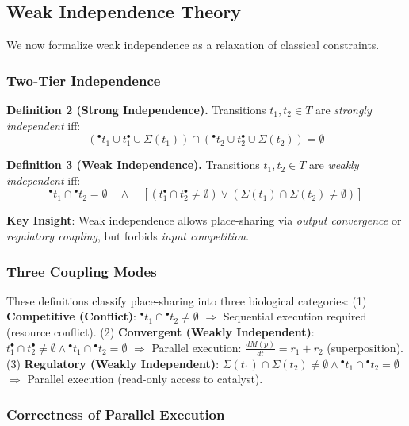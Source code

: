 \documentclass[twocolumn,11pt]{article}
\newcommand{\preset}[1]{\ensuremath{{}^{\bullet}#1}}
\newcommand{\postset}[1]{\ensuremath{#1^{\bullet}}}
\newcommand{\RegSet}[1]{\ensuremath{\Sigma(#1)}}
\begin{document}
\subsection{Weak Independence Theory}

We now formalize weak independence as a relaxation of classical constraints.

\subsubsection{Two-Tier Independence}

{\small
\textbf{Definition 2 (Strong Independence).}
Transitions $t_1, t_2 \in T$ are \emph{strongly independent} iff:
\begin{equation}
(\preset{t_1} \cup \postset{t_1} \cup \RegSet{t_1}) \cap (\preset{t_2} \cup \postset{t_2} \cup \RegSet{t_2}) = \emptyset
\end{equation}
}

{\small
\textbf{Definition 3 (Weak Independence).}
Transitions $t_1, t_2 \in T$ are \emph{weakly independent} iff:
\begin{equation}
\preset{t_1} \cap \preset{t_2} = \emptyset \quad \land \quad [(\postset{t_1} \cap \postset{t_2} \neq \emptyset) \lor (\RegSet{t_1} \cap \RegSet{t_2} \neq \emptyset)]
\end{equation}
}

\textbf{Key Insight}: Weak independence allows place-sharing via \emph{output convergence} or \emph{regulatory coupling}, but forbids \emph{input competition}.

\subsubsection{Three Coupling Modes}
These definitions classify place-sharing into three biological categories:
(1) \textbf{Competitive (Conflict)}: $\preset{t_1} \cap \preset{t_2} \neq \emptyset$ $\Rightarrow$ Sequential execution required (resource conflict).
(2) \textbf{Convergent (Weakly Independent)}: $\postset{t_1} \cap \postset{t_2} \neq \emptyset \land \preset{t_1} \cap \preset{t_2} = \emptyset$ $\Rightarrow$ Parallel execution: $\frac{dM(p)}{dt} = r_1 + r_2$ (superposition).
(3) \textbf{Regulatory (Weakly Independent)}: $\RegSet{t_1} \cap \RegSet{t_2} \neq \emptyset \land \preset{t_1} \cap \preset{t_2} = \emptyset$ $\Rightarrow$ Parallel execution (read-only access to catalyst).

\subsubsection{Correctness of Parallel Execution}
\end{document}
